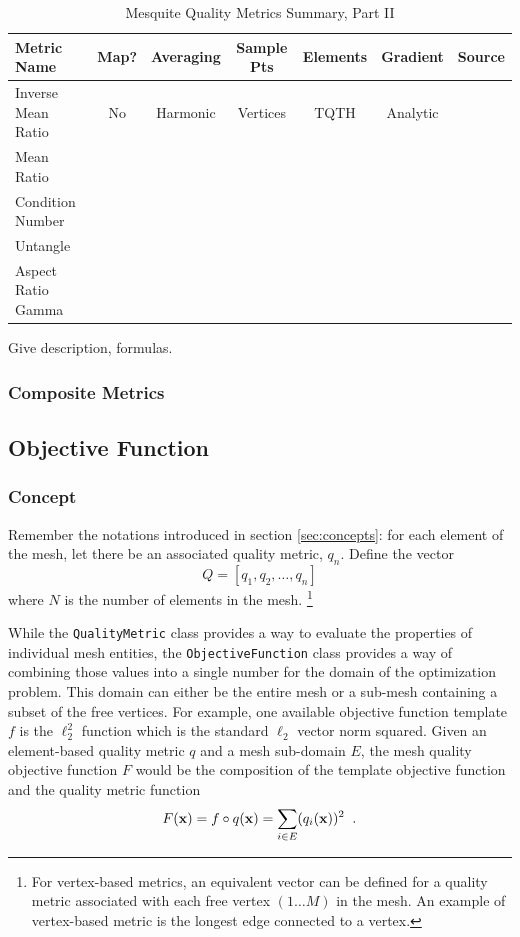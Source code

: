 \documentclass[letter]{report}
\begin{document}
\begin{table}[h]
\begin{center}
\begin{tabular}{|l|c|c|c|c|c|c|}
\hline
Metric Name & Map? & Averaging & Sample Pts & Elements & Gradient & Source \\ \hline
Inverse Mean Ratio & No & Harmonic & Vertices & TQTH & Analytic & \\ 
Mean Ratio &  &  &  &  &  \\ 
Condition Number &  &  &  &  &  \\ 
Untangle &  &  &  &  &  \\ 
Aspect Ratio Gamma &  &  &  &  &  \\ 
\hline
\end{tabular}
\caption{\label{QualityMetrics2} Mesquite Quality Metrics Summary, Part II}
\end{center}
\end{table}

 \newline
Give description, formulas. 

\subsubsection{Composite Metrics}

\subsection{Objective Function} \label{sec:ObjectiveFunction}

\subsubsection{Concept}
Remember the notations introduced in section \ref{sec:concepts}:
for each element of the mesh, let there be an associated quality metric, 
$q_n$.  Define the vector 
\begin{equation}
Q = [ q_1, q_2, \ldots, q_n ]
\end{equation}
where $N$ is the number of elements in the mesh. \footnote{For vertex-based metrics, an equivalent vector can be defined for a
quality metric associated with each free vertex $(1 \dots M)$ in the mesh. An example of vertex-based
metric is the longest edge connected to a vertex.}

While the \texttt{QualityMetric} class provides a way to evaluate the
properties of individual mesh entities, the \texttt{ObjectiveFunction}
class provides a way of combining those values into a single number
for the domain of the optimization problem.  This domain can either be
the entire mesh or a sub-mesh containing a subset of the free vertices.
For example, one available objective function template $f$ is the $\ell_{2}^2$
function which is the standard $\ell_{2}$ vector norm squared.  
Given an element-based quality metric $q$ and a mesh sub-domain $E$, the mesh 
quality objective function $F$ would be the composition of the template
objective function and the quality metric function 
\begin{equation}
F({\bf x}) = f \circ q({\bf x}) = \sum_{i \in E} (q_i({\bf x}))^2 \;\; .
\end{equation}
\end{document}
